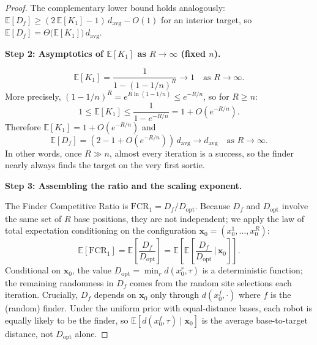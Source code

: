 \begin{proof}
The complementary lower bound holds analogously:
$\mathbb{E}[D_f] \geq (2\,\mathbb{E}[K_1]-1)\,d_{\mathrm{avg}} - O(1)$
for an interior target, so
$\mathbb{E}[D_f] = \Theta\bigl(\mathbb{E}[K_1]\bigr)\,d_{\mathrm{avg}}$.

\medskip
\noindent\textbf{Step 2: Asymptotics of $\mathbb{E}[K_1]$ as $R \to \infty$ (fixed $n$).}

\begin{equation}
  \mathbb{E}[K_1]
  = \frac{1}{1-(1-1/n)^R}
  \longrightarrow 1 \quad \text{as } R \to \infty.
\end{equation}
More precisely, $(1-1/n)^R = e^{R\ln(1-1/n)} \leq e^{-R/n}$, so for
$R \geq n$:
\begin{equation}
  1 \leq \mathbb{E}[K_1] \leq \frac{1}{1-e^{-R/n}} = 1 + O(e^{-R/n}).
\end{equation}
Therefore $\mathbb{E}[K_1] = 1 + O(e^{-R/n})$ and
\begin{equation}\label{eq:edf-limit}
  \mathbb{E}[D_f] = (2 - 1 + O(e^{-R/n}))\,d_{\mathrm{avg}}
  \to d_{\mathrm{avg}} \quad \text{as } R \to \infty.
\end{equation}
In other words, once $R \gg n$, almost every iteration is a success, so
the finder nearly always finds the target on the very first sortie.

\medskip
\noindent\textbf{Step 3: Assembling the ratio and the scaling exponent.}

The Finder Competitive Ratio is $\mathrm{FCR}_1 = D_f / D_{\mathrm{opt}}$.
Because $D_f$ and $D_{\mathrm{opt}}$ involve the same set of $R$ base
positions, they are not independent; we apply the law of total expectation
conditioning on the configuration $\mathbf{x}_0 = (x_0^1,\ldots,x_0^R)$:
\begin{equation}\label{eq:total-exp}
  \mathbb{E}[\mathrm{FCR}_1]
  = \mathbb{E}\!\left[\frac{D_f}{D_{\mathrm{opt}}}\right]
  = \mathbb{E}\!\left[
      \mathbb{E}\!\left[\frac{D_f}{D_{\mathrm{opt}}}\,\Bigg|\,\mathbf{x}_0\right]
    \right].
\end{equation}
Conditional on $\mathbf{x}_0$, the value $D_{\mathrm{opt}} =
\min_r d(x_0^r,\tau)$ is a deterministic function; the remaining
randomness in $D_f$ comes from the random site selections each iteration.
Crucially, $D_f$ depends on $\mathbf{x}_0$ only through $d(x_0^f,\cdot)$
where $f$ is the (random) finder.
Under the uniform prior with equal-distance bases, each robot is equally
likely to be the finder, so $\mathbb{E}[d(x_0^f,\tau) \mid \mathbf{x}_0]$
is the average base-to-target distance, not $D_{\mathrm{opt}}$ alone.


\end{proof}
